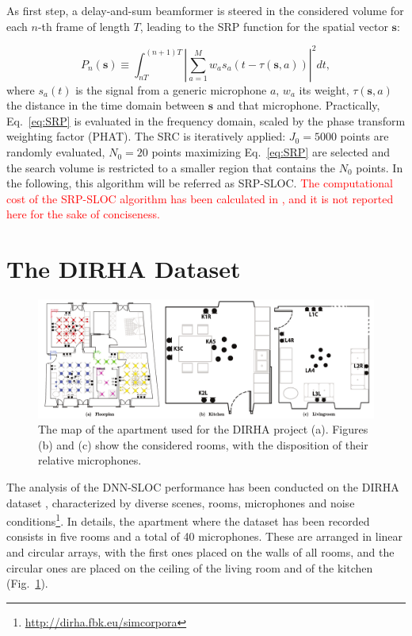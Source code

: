\documentclass[review]{elsarticle}
\newcommand{\figref}[1]{Fig.~\ref{#1}}
\let\originaleqref=\eqref
\renewcommand{\eqref}{Eq.~\originaleqref}
\begin{document}
As first step, a delay-and-sum beamformer is steered in the considered volume for each $n$-th frame of length $T$, leading to the SRP function for the spatial vector $\mathbf{s}$:

\begin{equation}
\label{eq:SRP}
P_n(\mathbf{s}) \equiv \int_{nT}^{(n+1)T} \left| \sum_{a=1}^M w_a s_a (t -\tau (\mathbf{s},a))\right|^2 dt,
\end{equation}
where $s_a(t)$ is the signal from a generic microphone $a$, $w_a$ its weight, $\tau (\mathbf{s},a)$ the distance in the time domain between $\mathbf{s}$ and that microphone. Practically, \eqref{eq:SRP} is evaluated in the frequency domain, scaled by the phase transform weighting factor (PHAT). The SRC is iteratively applied: $J_0 = 5000$ points are randomly evaluated, $N_0 = 20$ points maximizing \eqref{eq:SRP} are selected and the search volume is restricted to a smaller region that contains the $N_0$ points. In the following, this algorithm will be referred as SRP-SLOC. \textcolor{red}{The computational cost of the SRP-SLOC algorithm has been calculated in \cite{DoSY07}, and it is not reported here for the sake of conciseness.}


\section{The DIRHA Dataset}
\label{sec:dataset}

\begin{figure}[h]
	\centering
	\includegraphics[width=\textwidth]{imgs/plan}
	\caption{The map of the apartment used for the DIRHA project (a). Figures (b) and (c) show the considered rooms, with the disposition of their relative microphones. }
	\label{fig:DIRHA_map}
\end{figure}

The analysis of the DNN-SLOC performance has been conducted on the DIRHA dataset \cite{cristoforetti2014dirha}, characterized by diverse scenes, rooms, microphones and noise conditions\footnote{\url{http://dirha.fbk.eu/simcorpora}}. In details, the apartment where the dataset has been recorded consists in five rooms and a total of 40 microphones. These are arranged in linear and circular arrays, with the first ones placed on the walls of all rooms, and the circular ones are placed on the ceiling of the living room and of the kitchen (\figref{fig:DIRHA_map}).
\end{document}
